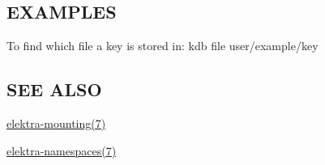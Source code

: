 \subsection*{E\+X\+A\+M\+P\+L\+E\+S}

To find which file a key is stored in\+: {\ttfamily kdb file user/example/key}

\subsection*{S\+E\+E A\+L\+S\+O}


\begin{DoxyItemize}
\item \hyperlink{md_doc_help_elektra-mounting_doc_help_elektra-mounting_md}{elektra-\/mounting(7)}
\item \hyperlink{md_doc_help_elektra-namespaces_doc_help_elektra-namespaces_md}{elektra-\/namespaces(7)} 
\end{DoxyItemize}